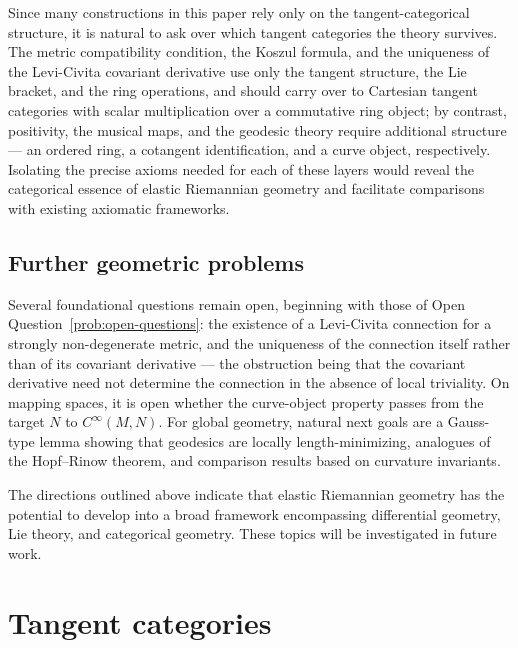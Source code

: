 \documentclass{amsart}
\theoremstyle{definition}
\begin{document}
Since many constructions in this paper rely only on the tangent-categorical
structure, it is natural to ask over which tangent categories the theory
survives. The metric compatibility condition, the Koszul formula, and the
uniqueness of the Levi-Civita covariant derivative use only the tangent
structure, the Lie bracket, and the ring operations, and should carry over
to Cartesian tangent categories with scalar multiplication over a
commutative ring object; by contrast, positivity, the musical maps, and the
geodesic theory require additional structure --- an ordered ring, a
cotangent identification, and a curve object, respectively. Isolating the
precise axioms needed for each of these layers would reveal the categorical
essence of elastic Riemannian geometry and facilitate comparisons with
existing axiomatic frameworks.

\subsection{Further geometric problems}\label{subsec:further-problems}

Several foundational questions remain open, beginning with those of Open
Question~\ref{prob:open-questions}: the existence of a Levi-Civita
connection for a strongly non-degenerate metric, and the uniqueness of the
connection itself rather than of its covariant derivative --- the
obstruction being that the covariant derivative need not determine the
connection in the absence of local triviality. On mapping spaces, it is
open whether the curve-object property passes from the target $N$ to
$C^\infty(M, N)$. For global geometry, natural next goals are a Gauss-type
lemma showing that geodesics are locally length-minimizing, analogues of
the Hopf--Rinow theorem, and comparison results based on curvature
invariants.

\medskip
The directions outlined above indicate that elastic Riemannian geometry has
the potential to develop into a broad framework encompassing differential
geometry, Lie theory, and categorical geometry. These topics will be
investigated in future work.

\appendix
\section{Tangent categories}\label{sec:tangent-categories}
\end{document}
